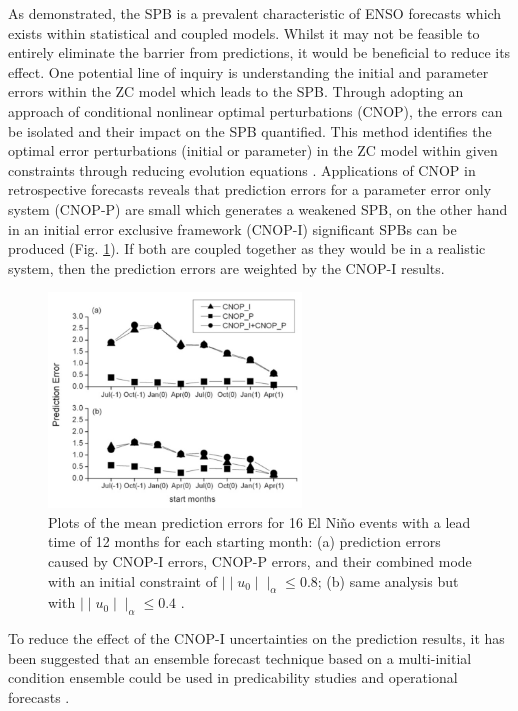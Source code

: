 \documentclass[12pt, onecolumn]{revtex4}    %
\begin{document}
As demonstrated, the SPB is a prevalent characteristic of ENSO forecasts which exists within statistical and coupled models. Whilst it may not be feasible to entirely eliminate the barrier from predictions, it would be beneficial to reduce its effect. One potential line of inquiry is understanding the initial and parameter errors within the ZC model which leads to the SPB. Through adopting an approach of conditional nonlinear optimal perturbations (CNOP), the errors can be isolated and their impact on the SPB quantified. This method identifies the optimal error perturbations (initial or parameter) in the ZC model within given constraints through reducing evolution equations \citep{mu2010extension}. Applications of CNOP in retrospective forecasts reveals that prediction errors for a parameter error only system (CNOP-P) are small which generates a weakened SPB, on the other hand in an initial error exclusive framework (CNOP-I) significant SPBs can be produced (Fig. \ref{fig:cnop}). If both are coupled together as they would be in a realistic system, then the prediction errors are weighted by the CNOP-I results. \\

\begin{figure}
\includegraphics[width=0.6\textwidth]{data/cnop}
\caption[CNOP]{Plots of the mean prediction errors for 16 El Ni\~{n}o events with a lead time of 12 months for each starting month: (a) prediction errors caused by CNOP-I errors, CNOP-P errors, and their combined mode with an initial constraint of $\mid \mid u_0 \mid \mid _\alpha \leq 0.8$; (b) same analysis but with $\mid \mid u_0 \mid \mid _\alpha \leq 0.4$ \citep{yu2012does}.}
\label{fig:cnop}
\end{figure}

To reduce the effect of the CNOP-I uncertainties on the prediction results, it has been suggested that an ensemble forecast technique based on a multi-initial condition ensemble could be used in predicability studies and operational forecasts \citep{kirtman2001current}.
\end{document}
